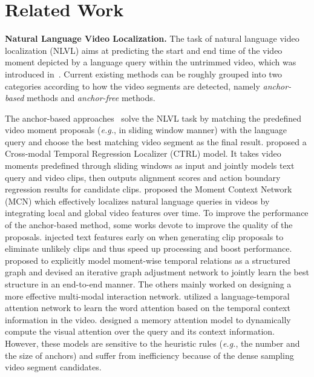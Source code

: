 \documentclass[letterpaper]{article} %
\newcommand{\eg}{\emph{e.g.}}
\begin{document}
\section{Related Work}
\textbf{Natural Language Video Localization.}
The task of natural language video localization (NLVL) aims at predicting the start and end time of the video moment depicted by a language query within the untrimmed video, which was introduced in~\cite{DBLP:conf/iccv/HendricksWSSDR17,DBLP:conf/iccv/GaoSYN17}.
Current existing methods can be roughly grouped into two categories according to how the video segments are detected, namely \emph{anchor-based} methods and \emph{anchor-free} methods.

The anchor-based approaches~\cite{DBLP:conf/iccv/GaoSYN17,DBLP:conf/iccv/HendricksWSSDR17,DBLP:conf/emnlp/HendricksWSSDR18,DBLP:conf/mm/LiuWN0CC18,DBLP:conf/sigir/LiuWN0CC18,DBLP:conf/aaai/Xu0PSSS19,DBLP:conf/cvpr/ZhangDWWD19} solve the NLVL task by matching the predefined video moment proposals (\eg, in sliding window manner) with the language query and choose the best matching video segment as the final result.
\citet{DBLP:conf/iccv/GaoSYN17} proposed a Cross-modal
Temporal Regression Localizer (CTRL) model. It takes video moments predefined through sliding windows as input and jointly models text
query and video clips, then outputs alignment scores and action
boundary regression results for candidate clips. 
\citet{DBLP:conf/iccv/HendricksWSSDR17} proposed the Moment Context Network (MCN) which effectively localizes natural language queries in videos by integrating local and global video features over time.
To improve the performance of the anchor-based method, some works devote to improve the quality of the proposals.
\citet{DBLP:conf/aaai/Xu0PSSS19} injected text features early on when generating clip proposals to eliminate unlikely clips and thus speed up processing and boost performance.
\citet{DBLP:conf/cvpr/ZhangDWWD19} proposed to explicitly model moment-wise temporal relations as a structured graph and devised
an iterative graph adjustment network to jointly learn the
best structure in an end-to-end manner.
The others mainly worked on designing a more effective multi-modal interaction network. 
\citet{DBLP:conf/mm/LiuWN0CC18} utilized a language-temporal
attention network to learn the word attention based on
the temporal context information in the video.
\citet{DBLP:conf/sigir/LiuWN0CC18} designed a memory attention model to dynamically compute the visual attention over the query and its context
information. However, these models are sensitive to the heuristic rules (\eg, the number and the size of anchors) and suffer from inefficiency because of the dense sampling video segment candidates.
\end{document}
